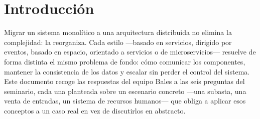 
\section*{Introducción}

Migrar un sistema monolítico a una arquitectura distribuida no elimina la
complejidad: la reorganiza. Cada estilo —basado en servicios, dirigido por
eventos, basado en espacio, orientado a servicios o de microservicios—
resuelve de forma distinta el mismo problema de fondo: cómo comunicar los
componentes, mantener la consistencia de los datos y escalar sin perder el
control del sistema. Este documento recoge las respuestas del equipo Bales a
las seis preguntas del seminario, cada una planteada sobre un escenario
concreto —una subasta, una venta de entradas, un sistema de recursos
humanos— que obliga a aplicar esos conceptos a un caso real en vez de
discutirlos en abstracto.

